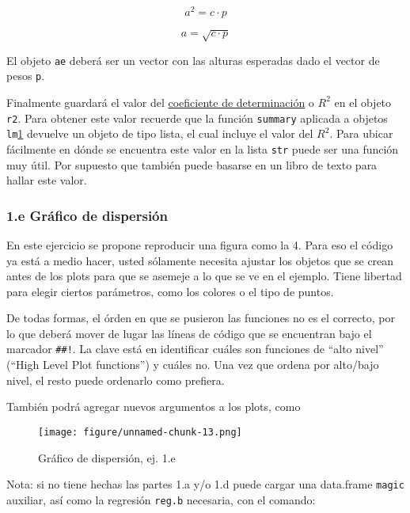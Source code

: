 \documentclass[]{article}
\makeatletter
\def\maxwidth{\ifdim\Gin@nat@width>\linewidth\linewidth
\else\Gin@nat@width\fi}
\let\Oldincludegraphics\includegraphics
\renewcommand{\includegraphics}[1]{\Oldincludegraphics[width=\maxwidth]{#1}}
\makeatother
\begin{document}
\[
  a ^ 2 = c \cdot p
\]

\[
  a = \sqrt{c \cdot p}
\]

El objeto \texttt{ae} deberá ser un vector con las alturas esperadas
dado el vector de pesos \texttt{p}.

Finalmente guardará el valor del
\href{https://en.wikipedia.org/wiki/Coefficient\_of\_determination}{coeficiente
de determinación} o $R^2$ en el objeto \texttt{r2}. Para obtener este
valor recuerde que la función \texttt{summary} aplicada a objetos
\texttt{lm}\href{i.e.\%20`summary.lm`,\%20aunque\%20por\%20supuesto\%20no\%20hay\%20que\%20poner\%20el\%20`.lm`\%20final,\%20ya\%20que\%20`summary`\%20es\%20una\%20función\%20genérica.}{1}
devuelve un objeto de tipo lista, el cual incluye el valor del $R^2$.
Para ubicar fácilmente en dónde se encuentra este valor en la lista
\texttt{str} puede ser una función muy útil. Por supuesto que también
puede basarse en un libro de texto para hallar este valor.

\subsubsection{1.e Gráfico de dispersión}

En este ejercicio se propone reproducir una figura como la 4. Para eso
el código ya está a medio hacer, usted sólamente necesita ajustar los
objetos que se crean antes de los plots para que se asemeje a lo que se
ve en el ejemplo. Tiene libertad para elegir ciertos parámetros, como
los colores o el tipo de puntos.

De todas formas, el órden en que se pusieron las funciones no es el
correcto, por lo que deberá mover de lugar las líneas de código que se
encuentran bajo el marcador \texttt{\#\#!}. La clave está en identificar
cuáles son funciones de ``alto nivel'' (``High Level Plot functions'') y
cuáles no. Una vez que ordena por alto/bajo nivel, el resto puede
ordenarlo como prefiera.

También podrá agregar nuevos argumentos a los plots, como

\begin{figure}[htbp]
\centering
\texttt{[image: figure/unnamed-chunk-13.png]}
\caption{Gráfico de dispersión, ej. 1.e}
\end{figure}

Nota: si no tiene hechas las partes 1.a y/o 1.d puede cargar una
data.frame \texttt{magic} auxiliar, así como la regresión \texttt{reg.b}
necesaria, con el comando:
\end{document}

